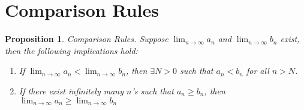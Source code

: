 \documentclass[12pt]{book}
\newtheorem{prop}{Proposition}
\theoremstyle{definition}
\begin{document}

\section{Comparison Rules}

\begin{prop}{Comparison Rules.}
\noindent
Suppose $\lim_{n \to \infty} a_n $ and $\lim_{n \to \infty} b_n$ exist, then the following implications hold:
\begin{enumerate}[label=(\alph*)]
	\item If $\lim_{n \to \infty} a_n < \lim_{n \to \infty} b_n $, then $\exists N >0$ such that $a_n <b_n$ for all $n>N$.
	\item If there exist infinitely many $n$'s such that $a_n\geq b_n$, then $\lim_{n \to \infty}a_n \geq \lim_{n \to \infty}b_n$
\end{enumerate}
\end{prop}
\end{document}
